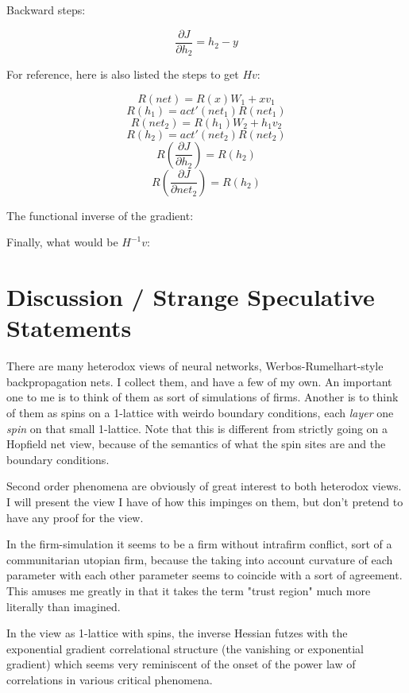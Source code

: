 \documentclass{article}
\begin{document}
Backward steps:

$$ \frac{\partial J}{\partial h_2} = h_2 - y $$

For reference, here is also listed the steps to get $Hv$:

$$ R(net) = R(x)W_1 + xv_1 $$
$$ R(h_1) = act'(net_1)R(net_1) $$
$$ R(net_2) = R(h_1)W_2 + h_1v_2 $$
$$ R(h_2) = act'(net_2)R(net_2) $$
$$ R(\frac{\partial J}{\partial h_2}) = R(h_2) $$
$$ R(\frac{\partial J}{\partial net_2}) = R(h_2) $$


The functional inverse of the gradient:

Finally, what would be $H^{-1}v$:


\section{Discussion / Strange Speculative Statements}

There are many heterodox views of neural networks, Werbos-Rumelhart-style backpropagation nets. I collect them, and have a few of my own. An important one to me is to think of them as sort of simulations of firms. Another is to think of them as spins on a 1-lattice with weirdo boundary conditions, each \textit{layer} one \textit{spin} on that small 1-lattice. Note that this is different from strictly going on a Hopfield net view, because of the semantics of what the spin sites are and the boundary conditions.

Second order phenomena are obviously of great interest to both heterodox views. I will present the view I have of how this impinges on them, but don't pretend to have any proof for the view.

In the firm-simulation it seems to be a firm without intrafirm conflict, sort of a communitarian utopian firm, because the taking into account curvature of each parameter with each other parameter seems to coincide with a sort of agreement. This amuses me greatly in that it takes the term "trust region" much more literally than imagined.

In the view as 1-lattice with spins, the inverse Hessian futzes with the exponential gradient correlational structure (the vanishing or exponential gradient) which seems very reminiscent of the onset of the power law of correlations in various critical phenomena.
\end{document}
